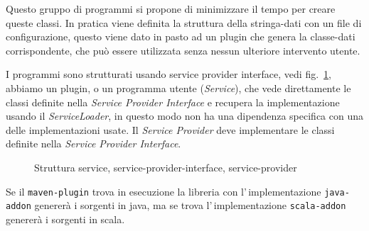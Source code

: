 \documentclass[a4paper,10pt]{report}
\begin{document}
Questo gruppo di programmi si propone di minimizzare il tempo per creare queste
classi. In pratica viene definita la struttura della stringa-dati con un file di
configurazione, questo viene dato in pasto ad un plugin che genera la 
classe-dati corrispondente, che può essere utilizzata senza nessun ulteriore
intervento utente.

I programmi sono strutturati usando service provider interface, 
vedi fig.~\ref{fig:spi}, abbiamo un plugin, o un programma utente 
(\textsl{Service}), che vede direttamente le classi definite nella 
\textsl{Service Provider Interface} e recupera la implementazione usando il 
\textsl{ServiceLoader}, in questo modo non ha una dipendenza specifica con una
delle implementazioni usate. 
Il \textsl{Service Provider} deve implementare le classi definite nella 
\textsl{Service Provider Interface}.

\begin{figure}[!htb]
\centering
{}
\caption{Struttura service, service-provider-interface, service-provider} 
\label{fig:spi}
\end{figure}

Se il \verb!maven-plugin! trova in esecuzione la libreria con 
l'\,implementazione \verb!java-addon! genererà i sorgenti in java, ma se trova
l'\,implementazione \verb!scala-addon! genererà i sorgenti in scala.
\end{document}
